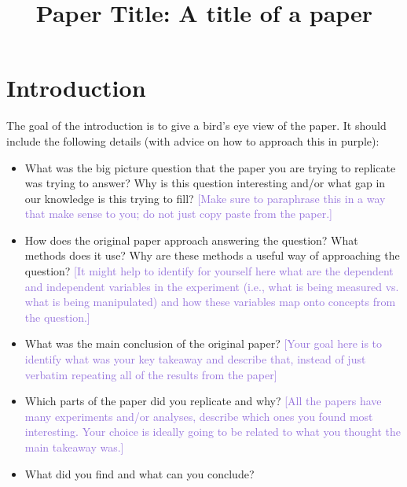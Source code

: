 \documentclass[11pt]{article}
\title{Paper Title: A title of a paper}
\newcommand{\advice}[1]{\textcolor{MediumPurple}{[#1]}}
\begin{document}
\maketitle

\section{Introduction}
The goal of the introduction is to give a bird's eye view of the paper. It should include the following details (with advice on how to approach this in purple):

\begin{itemize}
    \item What was the big picture question that the paper you are trying to replicate was trying to answer? Why is this question interesting and/or what gap in our knowledge is this trying to fill? \advice{Make sure to paraphrase this in a way that make sense to you; do not just copy paste from the paper.}

    \item How does the original paper approach answering the question? What methods does it use? Why are these methods a useful way of approaching the question? \advice{It might help to identify for yourself here what are the dependent and independent variables in the experiment (i.e., what is being measured vs. what is being manipulated) and how these variables map onto concepts from the question.}

    \item What was the main conclusion of the original paper? \advice{Your goal here is to identify what was your key takeaway and describe that, instead of just verbatim repeating all of the results from the paper}

    \item Which parts of the paper did you replicate and why? \advice{All the papers have many experiments and/or analyses, describe which ones you found most interesting. Your choice is ideally going to be related to what you thought the main takeaway was.}

    \item What did you find and what can you conclude?
\end{itemize}
\end{document}
